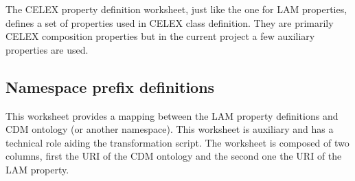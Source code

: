 The CELEX property definition worksheet, just like the one for LAM
properties, defines a set of properties used in CELEX class definition.
They are primarily CELEX composition properties but in the current project a few auxiliary properties are used.

\subsection{Namespace prefix definitions}
\label{sec:prefix-section}

This worksheet provides a mapping between the LAM property definitions
and CDM ontology (or another namespace). This worksheet is auxiliary and
has a technical role aiding the transformation script. The worksheet is
composed of two columns, first the URI of the CDM ontology and the
second one the URI of the LAM property.

